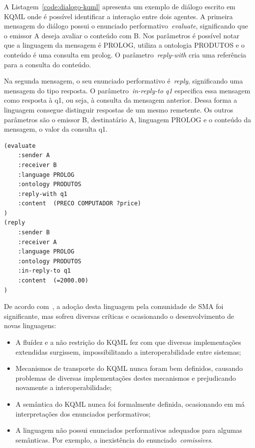 A Listagem~\ref{code:dialogo-kqml} apresenta um exemplo de diálogo escrito em KQML onde é possível identificar a interação entre dois agentes. A primeira mensagem do diálogo possui o enunciado performativo~\emph{evaluate}, significando que o emissor A deseja avaliar o conteúdo com B. Nos parâmetros é possível notar que a linguagem da mensagem é PROLOG, utiliza a ontologia PRODUTOS e o conteúdo é uma consulta em prolog. O parâmetro~\emph{reply-with} cria uma referência para a consulta do conteúdo.

Na segunda mensagem, o seu enunciado performativo é~\emph{reply}, significando uma mensagem do tipo resposta. O parâmetro~\emph{in-reply-to q1} especifica essa mensagem como resposta à q1, ou seja, à consulta da mensagem anterior. Dessa forma a linguagem consegue distinguir respostas de um mesmo remetente. Os outros parâmetros são o emissor B, destinatário A, linguagem PROLOG e o conteúdo da mensagem, o valor da consulta q1.

\begin{lstlisting}[label=code:dialogo-kqml,caption=Exemplo de diálogo em KQML]
(evaluate
	:sender A
	:receiver B
	:language PROLOG
	:ontology PRODUTOS
	:reply-with q1
	:content  (PRECO COMPUTADOR ?price)
)
(reply
	:sender B
	:receiver A
	:language PROLOG
	:ontology PRODUTOS
	:in-reply-to q1
	:content  (=2000.00)
)
\end{lstlisting}

De acordo com~\cite{wooldridge04}, a adoção desta linguagem pela comunidade de SMA foi significante, mas sofreu diversas críticas e ocasionando o desenvolvimento de novas linguagens:
\begin{itemize}
	\item A fluídez e a não restrição do KQML fez com que diversas implementações extendidas surgissem, impossibilitando a interoperabilidade entre sistemas;
	\item Mecanismos de transporte do KQML nunca foram bem definidos, causando problemas de diversas implementações destes mecanismos e prejudicando novamente a interoperabilidade;
	\item A semântica do KQML nunca foi formalmente definida, ocasionando em má interpretações dos enunciados performativos;
	\item A linguagem não possui enunciados performativos adequados para algumas semânticas. Por exemplo, a inexistência do enunciado~\emph{comissives}.
\end{itemize}

